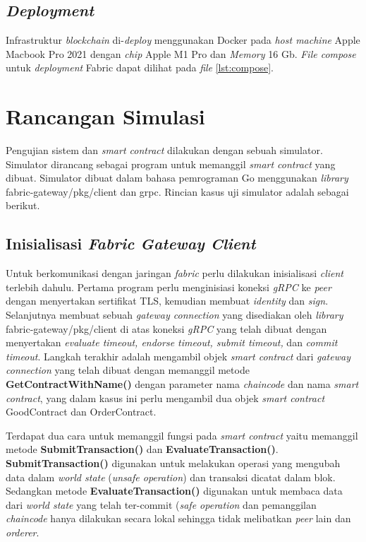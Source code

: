 

\subsection{\textit{Deployment}}
\label{subsec:deployment}
Infrastruktur \textit{blockchain} di-\textit{deploy} menggunakan Docker pada \textit{host machine} Apple Macbook Pro 2021 dengan \textit{chip} Apple M1 Pro dan \textit{Memory} 16 Gb. \textit{File compose} untuk \textit{deployment} Fabric dapat dilihat pada \textit{file} \ref{lst:compose}.



\section{Rancangan Simulasi}
\label{sec:simulation}
Pengujian sistem dan \textit{smart contract} dilakukan dengan sebuah simulator. Simulator dirancang sebagai program untuk memanggil \textit{smart contract} yang dibuat. Simulator dibuat dalam bahasa pemrograman Go menggunakan \textit{library} fabric-gateway/pkg/client dan grpc. Rincian kasus uji simulator adalah sebagai berikut.

\subsection{Inisialisasi \textit{Fabric Gateway Client}}
Untuk berkomunikasi dengan jaringan \textit{fabric} perlu dilakukan inisialisasi \textit{client} terlebih dahulu. Pertama program perlu menginisiasi koneksi \textit{gRPC} ke \textit{peer} dengan menyertakan sertifikat TLS, kemudian membuat \textit{identity} dan \textit{sign}. Selanjutnya membuat sebuah \textit{gateway connection} yang disediakan oleh \textit{library} fabric-gateway/pkg/client di atas koneksi \textit{gRPC} yang telah dibuat dengan menyertakan \textit{evaluate timeout, endorse timeout, submit timeout,} dan \textit{commit timeout}. Langkah terakhir adalah mengambil objek \textit{smart contract} dari \textit{gateway connection} yang telah dibuat dengan memanggil metode \textbf{GetContractWithName()} dengan parameter nama \textit{chaincode} dan nama \textit{smart contract}, yang dalam kasus ini perlu mengambil dua objek \textit{smart contract} GoodContract dan OrderContract. 

Terdapat dua cara untuk memanggil fungsi pada \textit{smart contract} yaitu memanggil metode \textbf{SubmitTransaction()} dan \textbf{EvaluateTransaction()}. \textbf{SubmitTransaction()} digunakan untuk melakukan operasi yang mengubah data dalam \textit{world state} (\textit{unsafe operation}) dan transaksi dicatat dalam blok. Sedangkan metode \textbf{EvaluateTransaction()} digunakan untuk membaca data dari \textit{world state} yang telah ter-commit (\textit{safe operation} dan pemanggilan \textit{chaincode} hanya dilakukan secara lokal sehingga tidak melibatkan \textit{peer} lain dan \textit{orderer}.

